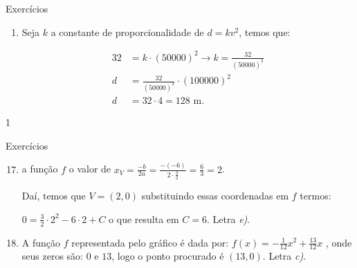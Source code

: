 {\begin{answer}{Exercícios}
{\begin{enumerate}
\begin{figure}[H]
\end{figure}

Temos que \(2y+4x=800\) logo \(y=400-2x\) , daí temos a área em função de \(x\), dada por \(A(x)=y\cdot x=(400-2x)\cdot x=-2x^2+400\) portanto a área máxima é dada por \(A=\dfrac{-\Delta}{4a}=20000m^2\).


\item Seja \(k\) a constante de proporcionalidade de \(d=kv^2\), temos que:

\begin{align*}
32&=k \cdot (50 000)^2 \to k=\frac{32}{(50 000)^2}\\
d&=\frac{32}{(50 000)^2} \cdot (100 000)^2\\
d&=32 \cdot 4 = 128\text{ m}.
\end{align*}
\end{enumerate}
}{1}
\end{answer}
\clearmargin
\begin{answer}{Exercícios}
{\exerciselist
\begin{enumerate}\setcounter{enumi}{16}
\item a função \(f\) o valor de \(x_V=\frac{-b}{2a}=\frac{-(-6)}{2\cdot\frac{3}{2}}=\frac{6}{3}=2\).

Daí, temos que \(V=(2,0)\) substituindo essas coordenadas em \(f\) termos:

\(0=\frac{3}{2}\cdot2^2-6\cdot2+C\) o que resulta em \(C=6\). Letra \textit{e)}.


\item A função \(f\) representada pelo gráfico é dada por: \(f(x)=-\frac{1}{12}x^2+\frac{13}{12}x\) , onde seus zeros são: \(0\) e \(13\), logo o ponto procurado é \((13,0)\). Letra \textit{c)}.


\end{enumerate}}
\end{answer}}
